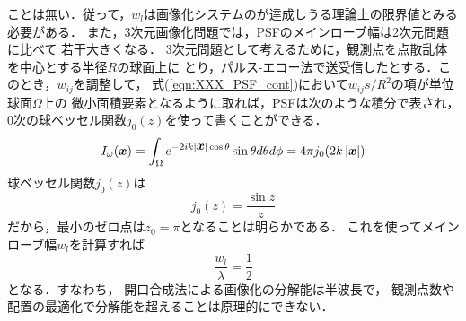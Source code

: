 ことは無い．従って，$w_l$は画像化システムのが達成しうる理論上の限界値とみる必要がある．
また，3次元画像化問題では，PSFのメインローブ幅は2次元問題に比べて
若干大きくなる．
3次元問題として考えるために，観測点を点散乱体を中心とする半径$R$の球面上に
とり，パルス-エコー法で送受信したとする．このとき，$w_{ij}$を調整して，
式(\ref{eqn:XXX_PSF_cont})において$w_{ij}s/R^2$の項が単位球面$\Omega$上の
微小面積要素となるように取れば，PSFは次のような積分で表され，
0次の球ベッセル関数$j_0(z)$を使って書くことができる．
\begin{equation}
	I_\omega(\mbox{\boldmath $x$})
		=
	\int_\Omega
	e^{
	-2ik |\mbox{\boldmath $x$}| \cos \theta
	}
	\sin\theta
	d\theta d\phi
	=
	4\pi j_0(2k\left|\mbox{\boldmath $x$}\right|)
	\label{eqn:XXX_PSF_J0}
\end{equation}
球ベッセル関数$j_0(z)$は
\begin{equation}
	j_0(z)=\frac{\sin z}{z}
\end{equation}	
だから，最小のゼロ点は$z_0=\pi$となることは明らかである．
これを使ってメインローブ幅$w_l$を計算すれば
\begin{equation}
	\frac{w_l}{\lambda}=\frac{1}{2}
	\label{eqn:}
\end{equation}
となる．すなわち， 開口合成法による画像化の分解能は半波長で，
観測点数や配置の最適化で分解能を超えることは原理的にできない．
